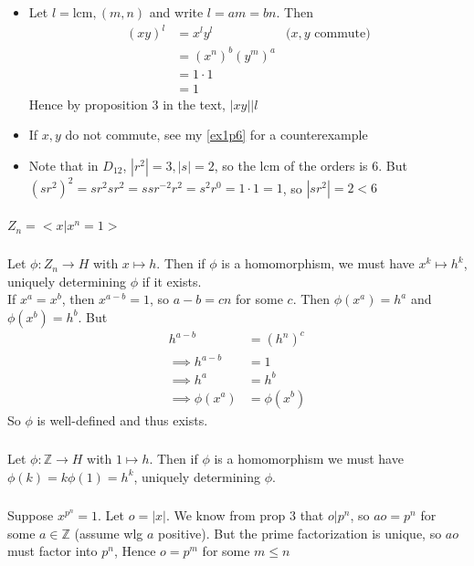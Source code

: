 \documentclass{article}
\newcommand{\ints}{\mathbb{Z}}
\newcommand{\lcm}{ \textrm{lcm}, }
\newcommand{\norm}[1]{|#1|}
\newcommand{\divides}{\vert}
\newcommand{\cyclic}[1]{<#1>}
\begin{document}
\subsubsection{}\label{ex3p16}
\begin{itemize}
\item Let $l = \lcm(m,n)$ and write $l=am=bn$. Then
\begin{align*}
(xy)^l &= x^ly^l & \mbox{($x,y$ commute)}\\
&= (x^n)^b(y^m)^a\\
&= 1\cdot 1\\
&= 1
\end{align*}
Hence by proposition 3 in the text, $\norm{xy} \divides l$
\item If $x,y$ do not commute, see my \ref{ex1p6} for a counterexample
\item Note that in $D_{12}$, $\norm{r^2} = 3, \norm{s}=2$, so the lcm of the orders is $6$. But $(sr^2)^2 = sr^2sr^2 = ssr^{-2}r^2 = s^2r^0 = 1\cdot 1 = 1$, so $\norm{sr^2} = 2 < 6$
\end{itemize}
\subsubsection{}\label{ex3p17}
$Z_n = \cyclic{x | x^n=1 }$
\subsubsection{}\label{ex3p18}
Let $\phi: Z_n \to H$ with $x \mapsto h$. Then if $\phi$ is a homomorphism, we must have $x^k \mapsto h^k$, uniquely determining $\phi$ if it exists.\\
If $x^a = x^b$, then $x^{a-b}=1$, so $a-b=cn$ for some $c$. Then $\phi(x^a)=h^a$ and $\phi(x^b)=h^b$. But 
\begin{align*}
h^{a-b} &= (h^n)^c\\
\implies h^{a-b} &= 1\\
\implies h^a &= h^b\\
\implies \phi(x^a) &= \phi(x^b)
\end{align*}
So $\phi$ is well-defined and thus exists.
\subsubsection{}\label{ex3p19}
Let $\phi: \ints \to H$ with $1\mapsto h$. Then if $\phi$ is a homomorphism we must have $\phi(k)=k\phi(1)=h^k$, uniquely determining $\phi$.
\subsubsection{}\label{ex3p20}
Suppose $x^{p^n} = 1$. Let $o=\norm{x}$. We know from prop 3 that $o \divides p^n$, so $ao = p^n$ for some $a \in \ints$ (assume wlg $a$ positive). But the prime factorization is unique, so $ao$ must factor into $p^n$, Hence $o=p^m$ for some $m\leq n$
\end{document}
